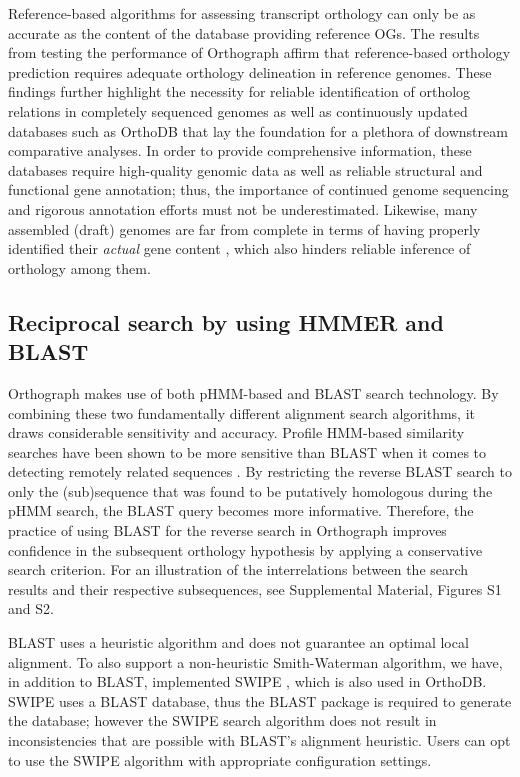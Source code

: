 Reference-based algorithms for assessing transcript orthology can only
be as accurate as the content of the database providing reference OGs.
The results from testing the performance of Orthograph affirm that
reference-based orthology prediction requires adequate orthology
delineation in reference genomes. These findings further highlight the
necessity for reliable identification of ortholog relations in
completely sequenced genomes as well as continuously updated databases
such as OrthoDB that lay the foundation for a plethora of downstream
comparative analyses. In order to provide comprehensive information,
these databases require high-quality genomic data as well as reliable
structural and functional gene annotation; thus, the importance of
continued genome sequencing and rigorous annotation efforts must not be
underestimated. Likewise, many assembled (draft) genomes are far from
complete in terms of having properly identified their \emph{actual} gene
content \cite{Denton2014}, which also hinders reliable inference of
orthology among them.

\subsection{Reciprocal search by using HMMER and
BLAST}\label{reciprocal-search-by-using-hmmer-and-blast}

Orthograph makes use of both pHMM-based and BLAST search technology. By
combining these two fundamentally different alignment search algorithms,
it draws considerable sensitivity and accuracy. Profile HMM-based
similarity searches have been shown to be more sensitive than BLAST when
it comes to detecting remotely related sequences \cite{Eddy2011}. By
restricting the reverse BLAST search to only the (sub)sequence that was
found to be putatively homologous during the pHMM search, the BLAST
query becomes more informative. Therefore, the practice of using BLAST
for the reverse search in Orthograph improves confidence in the
subsequent orthology hypothesis by applying a conservative search
criterion. For an illustration of the interrelations between the search
results and their respective subsequences, see Supplemental Material,
Figures S1 and S2.

BLAST uses a heuristic algorithm and does not guarantee an optimal local
alignment. To also support a non-heuristic Smith-Waterman algorithm, we
have, in addition to BLAST, implemented SWIPE \cite{Rognes2011}, which
is also used in OrthoDB. SWIPE uses a BLAST database, thus the BLAST
package is required to generate the database; however the SWIPE search
algorithm does not result in inconsistencies that are possible with
BLAST's alignment heuristic. Users can opt to use the SWIPE algorithm
with appropriate configuration settings.

